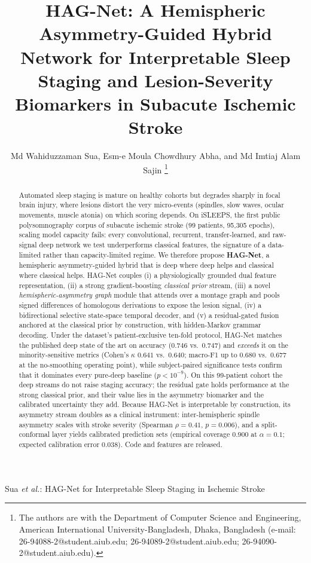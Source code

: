 \documentclass[journal]{IEEEtran}
\newcommand{\hagMfR}{0.680}    %
\newcommand{\hagAccH}{0.746}   %
\newcommand{\hagKH}{0.641}     %
\begin{document}
\title{HAG-Net: A Hemispheric Asymmetry-Guided Hybrid Network for Interpretable Sleep Staging and Lesion-Severity Biomarkers in Subacute Ischemic Stroke}

\author{Md Wahiduzzaman Sua, Esm-e Moula Chowdhury Abha, and Md Imtiaj Alam Sajin%
\thanks{The authors are with the Department of Computer Science and Engineering,
American International University-Bangladesh, Dhaka, Bangladesh
(e-mail: 26-94088-2@student.aiub.edu; 26-94089-2@student.aiub.edu;
26-94090-2@student.aiub.edu).}}

%
{Sua \MakeLowercase{\textit{et al.}}: HAG-Net for Interpretable Sleep Staging in Ischemic Stroke}

\maketitle

\begin{abstract}
Automated sleep staging is mature on healthy cohorts but degrades sharply in
focal brain injury, where lesions distort the very micro-events (spindles, slow
waves, ocular movements, muscle atonia) on which scoring depends. On iSLEEPS,
the first public polysomnography corpus of subacute ischemic stroke (99 patients,
95{,}305 epochs), scaling model capacity fails: every convolutional, recurrent,
transfer-learned, and raw-signal deep network we test underperforms classical
features, the signature of a data-limited rather than capacity-limited regime.
We therefore propose \textbf{HAG-Net}, a hemispheric asymmetry-guided hybrid that
is deep where deep helps and classical where classical helps. HAG-Net couples
(i) a physiologically grounded dual feature representation, (ii) a strong
gradient-boosting \emph{classical prior} stream, (iii) a novel
\emph{hemispheric-asymmetry graph} module that attends over a montage graph and
pools signed differences of homologous derivations to expose the lesion signal,
(iv) a bidirectional selective state-space temporal decoder, and (v) a
residual-gated fusion anchored at the classical prior by construction, with
hidden-Markov grammar decoding. Under the dataset's patient-exclusive ten-fold
protocol, HAG-Net matches the published deep state of the art on accuracy
($\hagAccH$ vs.\ $0.747$) and \emph{exceeds} it on the minority-sensitive metrics
(Cohen's $\kappa$ $\hagKH$ vs.\ $0.640$; macro-F1 up to $\hagMfR$ vs.\ $0.677$ at
the no-smoothing operating point), while subject-paired significance tests confirm
that it dominates every pure-deep baseline ($p<10^{-9}$). On this 99-patient cohort
the deep streams do not raise staging accuracy; the residual gate holds performance
at the strong classical prior, and their value lies in the asymmetry biomarker and
the calibrated uncertainty they add.
Because HAG-Net is interpretable by construction, its
asymmetry stream doubles as a clinical instrument: inter-hemispheric spindle
asymmetry scales with stroke severity (Spearman $\rho=0.41$, $p=0.006$), and a
split-conformal layer yields calibrated prediction sets (empirical coverage
$0.900$ at $\alpha{=}0.1$; expected calibration error $0.038$). Code and features
are released.
\end{abstract}
\end{document}
